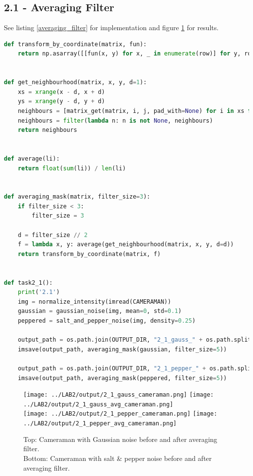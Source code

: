 \newpage
\subsection*{2.1 - Averaging Filter}

See listing \ref{averaging_filter} for implementation and figure \ref{avg_filter_results} for results.

\begin{lstlisting}[language=Python, label=averaging_filter, caption=Averaging Filter]
def transform_by_coordinate(matrix, fun):
    return np.asarray([[fun(x, y) for x, _ in enumerate(row)] for y, row in enumerate(matrix)])


def get_neighbourhood(matrix, x, y, d=1):
    xs = xrange(x - d, x + d)
    ys = xrange(y - d, y + d)
    neighbours = [matrix_get(matrix, i, j, pad_with=None) for i in xs for j in ys]
    neighbours = filter(lambda n: n is not None, neighbours)
    return neighbours


def average(li):
    return float(sum(li)) / len(li)


def averaging_mask(matrix, filter_size=3):
    if filter_size < 3:
        filter_size = 3

    d = filter_size // 2
    f = lambda x, y: average(get_neighbourhood(matrix, x, y, d=d))
    return transform_by_coordinate(matrix, f)


def task2_1():
    print('2.1')
    img = normalize_intensity(imread(CAMERAMAN))
    gaussian = gaussian_noise(img, mean=0, std=0.1)
    peppered = salt_and_pepper_noise(img, density=0.25)

    output_path = os.path.join(OUTPUT_DIR, "2_1_gauss_" + os.path.split(CAMERAMAN)[-1])
    imsave(output_path, averaging_mask(gaussian, filter_size=5))

    output_path = os.path.join(OUTPUT_DIR, "2_1_pepper_" + os.path.split(CAMERAMAN)[-1])
    imsave(output_path, averaging_mask(peppered, filter_size=5))
\end{lstlisting}

\newpage
\begin{figure}[h!]
    \centering
    \texttt{[image: ../LAB2/output/2\_1\_gauss\_cameraman.png]}
    \texttt{[image: ../LAB2/output/2\_1\_gauss\_avg\_cameraman.png]} \\
    \texttt{[image: ../LAB2/output/2\_1\_pepper\_cameraman.png]}
    \texttt{[image: ../LAB2/output/2\_1\_pepper\_avg\_cameraman.png]}
    \caption{Top: Cameraman with Gaussian noise before and after averaging filter. \\ Bottom: Cameraman with salt \& pepper noise before and after averaging filter.}
    \label{avg_filter_results}
\end{figure}



